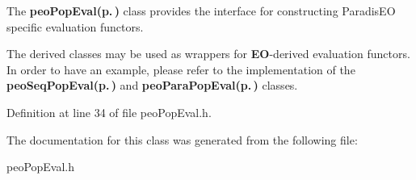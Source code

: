 The {\bf {\bf peo\-Pop\-Eval}{\rm (p.\,\pageref{classpeo_pop_eval})}} class provides the interface for constructing Paradis\-EO specific evaluation functors. 

The derived classes may be used as wrappers for {\bf EO}-derived evaluation functors. In order to have an example, please refer to the implementation of the {\bf {\bf peo\-Seq\-Pop\-Eval}{\rm (p.\,\pageref{classpeo_seq_pop_eval})}} and {\bf {\bf peo\-Para\-Pop\-Eval}{\rm (p.\,\pageref{classpeo_para_pop_eval})}} classes. 



Definition at line 34 of file peo\-Pop\-Eval.h.

The documentation for this class was generated from the following file:\begin{CompactItemize}
\item 
peo\-Pop\-Eval.h\end{CompactItemize}
